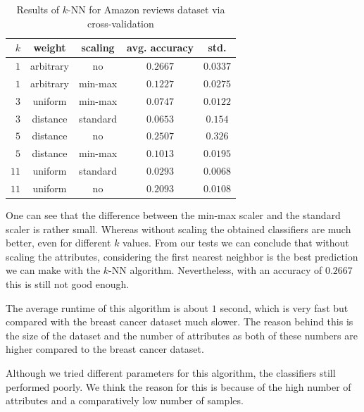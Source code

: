 \documentclass[a4paper,11pt]{article}
\begin{document}
        \begin{table}[h!]
        \centering
            \begin{tabular}[h]{r|c|c|c|c}
                $k$ & weight & scaling & avg. accuracy & std.\\
                \hline
                $1$ & arbitrary & no & $0.2667$ & $0.0337$ \\
                \hline
                $1$ & arbitrary & min-max & $0.1227$ & $0.0275$ \\
                \hline
                $3$ & uniform & min-max & $0.0747$ & $0.0122$ \\
                \hline
                $3$ & distance & standard & $0.0653$ & $0.154$ \\
                \hline
                $5$ & distance & no & $0.2507$ & $0.326$ \\
                \hline
                $5$ & distance & min-max & $0.1013$ & $0.0195$ \\
                \hline
                $11$ & uniform & standard & $0.0293$ & $0.0068$ \\
                \hline
                $11$ & uniform & no & $0.2093$ & $0.0108$
            \end{tabular}
            \caption{Results of $k$-NN for Amazon reviews dataset via cross-validation}
            \label{tbl:kNN_amazon_cross-validation}
        \end{table}
        
        One can see that the difference between the min-max scaler and the standard scaler is rather small. Whereas without scaling the obtained classifiers are much better, even for different $k$ values. From our tests we can conclude that without scaling the attributes, considering the first nearest neighbor is the best prediction we can make with the $k$-NN algorithm. Nevertheless, with an accuracy of $0.2667$ this is still not good enough. 
        
        The average runtime of this algorithm is about $1$ second, which is very fast but compared with the breast cancer dataset much slower. The reason behind this is the size of the dataset and the number of attributes as both of these numbers are higher compared to the breast cancer dataset. 
        
        Although we tried different parameters for this algorithm, the classifiers still performed poorly. We think the reason for this is because of the high number of attributes and a comparatively low number of samples.
        
\end{document}
